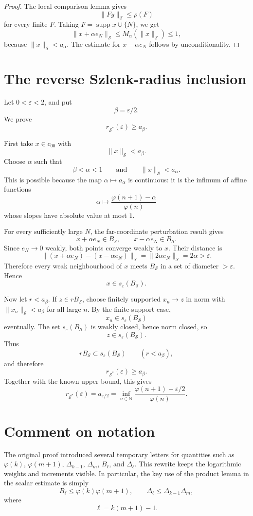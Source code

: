 \documentclass[11pt]{article}
\newcommand{\ph}{\varphi}
\newcommand{\N}{\mathbb N}
\newcommand{\Ssp}{\mathcal S}
\newcommand{\Ball}{B}
\newcommand{\Bell}[1]{B_{#1}}
\newcommand{\Delt}[1]{\Delta_{#1}}
\begin{document}
\begin{proof}
The local comparison lemma gives
\[
 \|Fy\|_{\Ssp}\le \rho(F)
\]
for every finite \(F\).  Taking \(F=\operatorname{supp}x\cup\{N\}\), we get
\[
 \|x+\alpha e_N\|_{\Ssp}
 \le
 M_\alpha(\|x\|_{\Ssp})
 \le 1,
\]
because \(\|x\|_{\Ssp}<a_\alpha\).  The estimate for
\(x-\alpha e_N\) follows by unconditionality.
\end{proof}

\section{The reverse Szlenk-radius inclusion}

Let \(0<\varepsilon<2\), and put
\[
 \beta=\varepsilon/2.
\]
We prove
\[
 r_{\Ssp^*}(\varepsilon)\ge a_\beta.
\]

First take \(x\in c_{00}\) with
\[
 \|x\|_{\Ssp}<a_\beta.
\]
Choose \(\alpha\) such that
\[
 \beta<\alpha<1
 \qquad\text{and}\qquad
 \|x\|_{\Ssp}<a_\alpha.
\]
This is possible because the map \(\alpha\mapsto a_\alpha\) is continuous:
it is the infimum of affine functions
\[
 \alpha\mapsto \frac{\ph(n+1)-\alpha}{\ph(n)}
\]
whose slopes have absolute value at most \(1\).

For every sufficiently large \(N\), the far-coordinate perturbation result
gives
\[
 x+\alpha e_N\in \Ball_{\Ssp},
 \qquad
 x-\alpha e_N\in \Ball_{\Ssp}.
\]
Since \(e_N\to 0\) weakly, both points converge weakly to \(x\).  Their
distance is
\[
 \|(x+\alpha e_N)-(x-\alpha e_N)\|_{\Ssp}
 =
 \|2\alpha e_N\|_{\Ssp}
 =
 2\alpha
 >
 \varepsilon.
\]
Therefore every weak neighbourhood of \(x\) meets \(\Ball_{\Ssp}\) in a set
of diameter \(>\varepsilon\).  Hence
\[
 x\in s_\varepsilon(\Ball_{\Ssp}).
\]

Now let \(r<a_\beta\).  If \(z\in r\Ball_{\Ssp}\), choose finitely
supported \(x_n\to z\) in norm with \(\|x_n\|_{\Ssp}<a_\beta\) for all
large \(n\).  By the finite-support case,
\[
 x_n\in s_\varepsilon(\Ball_{\Ssp})
\]
eventually.  The set \(s_\varepsilon(\Ball_{\Ssp})\) is weakly closed,
hence norm closed, so
\[
 z\in s_\varepsilon(\Ball_{\Ssp}).
\]
Thus
\[
 r\Ball_{\Ssp}\subset s_\varepsilon(\Ball_{\Ssp})
 \qquad(r<a_\beta),
\]
and therefore
\[
 r_{\Ssp^*}(\varepsilon)\ge a_\beta.
\]
Together with the known upper bound, this gives
\[
 r_{\Ssp^*}(\varepsilon)
 =
 a_{\varepsilon/2}
 =
 \inf_{n\in\N}
 \frac{\ph(n+1)-\varepsilon/2}{\ph(n)}.
\]

\section*{Comment on notation}

The original proof introduced several temporary letters for quantities such
as \(\ph(k)\), \(\ph(m+1)\), \(\Delt{k-1}\), \(\Delt{m}\),
\(\Bell{\ell}\), and \(\Delt{\ell}\).  This rewrite keeps the logarithmic
weights and increments visible.  In particular, the key use of the product
lemma in the scalar estimate is simply
\[
 \Bell{\ell}\le \ph(k)\ph(m+1),
 \qquad
 \Delt{\ell}\le \Delt{k-1}\Delt{m},
\]
where
\[
 \ell=k(m+1)-1.
\]
\end{document}

